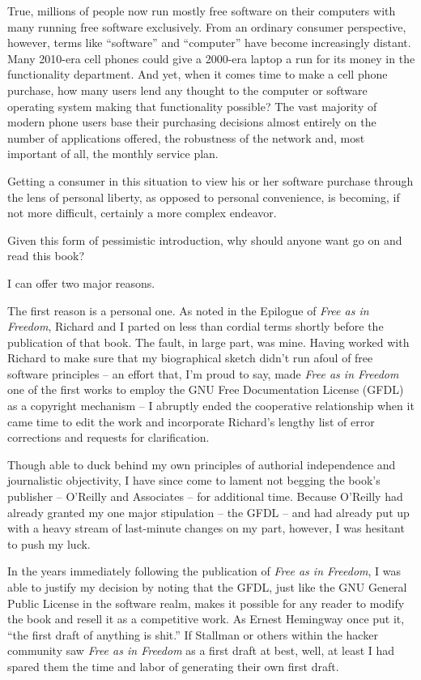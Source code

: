 True, millions of people now run mostly free software on their
computers with many running free software exclusively. From an
ordinary consumer perspective, however, terms like ``software'' and
``computer'' have become increasingly distant. Many 2010-era cell
phones could give a 2000-era laptop a run for its money in the
functionality department. And yet, when it comes time to make a cell
phone purchase, how many users lend any thought to the computer or
software operating system making that functionality possible? The vast
majority of modern phone users base their purchasing decisions almost
entirely on the number of applications offered, the robustness of the
network and, most important of all, the monthly service plan.

Getting a consumer in this situation to view his or her software  
purchase through the lens of personal liberty, as opposed to personal  
convenience, is becoming, if not more difficult, certainly a more  
complex endeavor.

Given this form of pessimistic introduction, why should anyone want go  
on and read this book?

I can offer two major reasons.

The first reason is a personal one. As noted in the Epilogue of
\textit{Free as in Freedom}, Richard and I parted on less than cordial
terms shortly before the publication of that book. The fault, in large
part, was mine. Having worked with Richard to make sure that my
biographical sketch didn't run afoul of free software principles -- an
effort that, I'm proud to say, made \textit{Free as in Freedom} one of
the first works to employ the GNU Free Documentation License (GFDL) as
a copyright mechanism -- I abruptly ended the cooperative relationship
when it came time to edit the work and incorporate Richard's lengthy
list of error corrections and requests for clarification.

Though able to duck behind my own principles of authorial independence
and journalistic objectivity, I have since come to lament not begging
the book's publisher -- O'Reilly and Associates -- for additional time.
Because O'Reilly had already granted my one major stipulation -- the
GFDL -- and had already put up with a heavy stream of last-minute
changes on my part, however, I was hesitant to push my luck.

In the years immediately following the publication of \textit{Free as
  in Freedom}, I was able to justify my decision by noting that the
GFDL, just like the GNU General Public License in the software realm,
makes it possible for any reader to modify the book and resell it as a
competitive work. As Ernest Hemingway once put it, ``the first draft
of anything is shit.'' If Stallman or others within the hacker
community saw \textit{Free as in Freedom} as a first draft at best,
well, at least I had spared them the time and labor of generating
their own first draft.

